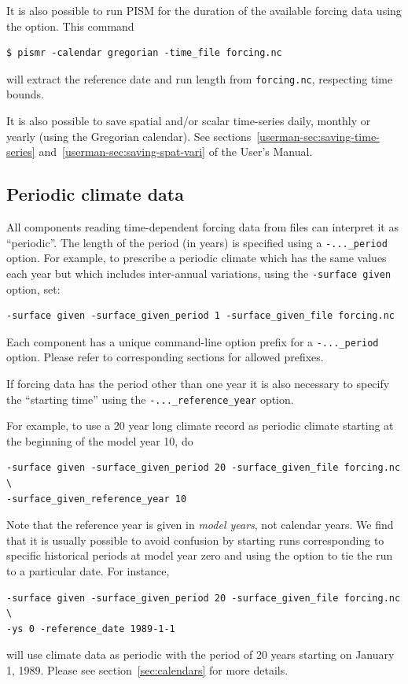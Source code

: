 \documentclass[titlepage,letterpaper,final]{scrartcl}
\begin{document}
It is also possible to run PISM for the duration of the available forcing data using the  option.
This command
\begin{verbatim}
$ pismr -calendar gregorian -time_file forcing.nc
\end{verbatim} %
will extract the reference date and run length from \texttt{forcing.nc}, respecting time bounds.

It is also possible to save spatial and/or scalar time-series daily, monthly or
yearly (using the Gregorian calendar). See sections~\ref*{userman-sec:saving-time-series}
and~\ref*{userman-sec:saving-spat-vari} of the User's Manual.


\subsection{Periodic climate data}
\label{sec:periodic-forcing}

All components reading time-dependent forcing data from files can interpret
it as ``periodic''.  The length of the period (in years) is specified using
a \texttt{-..._period} option.  For example, to prescribe a periodic climate
which has the same values each year but which includes
inter-annual variations, using the \texttt{-surface given} option, set:
\begin{verbatim}
-surface given -surface_given_period 1 -surface_given_file forcing.nc
\end{verbatim}

Each component has a unique command-line option prefix for a
\texttt{-..._period} option. Please refer to corresponding sections for
allowed prefixes.

If forcing data has the period other than one year it is also
necessary to specify the ``starting time'' using the
\texttt{-..._reference_year} option.

For example, to use a 20 year long climate record as periodic climate starting
at the beginning of the model year 10, do
\begin{verbatim}
-surface given -surface_given_period 20 -surface_given_file forcing.nc \
-surface_given_reference_year 10
\end{verbatim}

Note that the reference year is given in \emph{model years}, not calendar
years. We find that it is usually possible to avoid confusion by starting runs
corresponding to specific historical periods at model year zero and using the
\intextoption{reference_date} option to tie the run to a particular date. For instance,
\begin{verbatim}
-surface given -surface_given_period 20 -surface_given_file forcing.nc \
-ys 0 -reference_date 1989-1-1
\end{verbatim}
will use climate data as periodic with the period of 20 years starting on
January 1, 1989. Please see section~\ref{sec:calendars} for more details.
\end{document}
